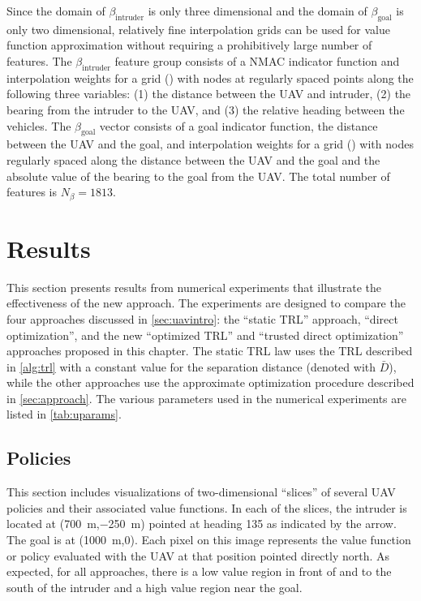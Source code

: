 Since the domain of $\beta_\text{intruder}$ is only three dimensional and the domain of $\beta_\text{goal}$ is only two dimensional, relatively fine interpolation grids can be used for value function approximation without requiring a prohibitively large number of features. The $\beta_\text{intruder}$ feature group consists of a NMAC indicator function and interpolation weights for a grid () with nodes at regularly spaced points along the following three variables: (1) the distance between the UAV and intruder, (2) the bearing from the intruder to the UAV, and (3) the relative heading between the vehicles. The $\beta_\text{goal}$ vector consists of a goal indicator function, the distance between the UAV and the goal, and interpolation weights for a grid () with nodes regularly spaced along the distance between the UAV and the goal and the absolute value of the bearing to the goal from the UAV. The total number of features is $N_\beta = 1813$.


\section{Results} \label{sec:results}

This section presents results from numerical experiments that illustrate the effectiveness of the new approach. The experiments are designed to compare the four approaches discussed in \cref{sec:uavintro}: the ``static TRL'' approach, ``direct optimization'', and the new ``optimized TRL'' and ``trusted direct optimization'' approaches proposed in this chapter. The static TRL law uses the TRL described in \cref{alg:trl} with a constant value for the separation distance (denoted with $\bar{D}$), while the other approaches use the approximate optimization procedure described in \cref{sec:approach}. The various parameters used in the numerical experiments are listed in \cref{tab:uparams}.

\subsection{Policies}

This section includes visualizations of two-dimensional ``slices'' of several UAV policies and their associated value functions. In each of the slices, the intruder is located at (\SI{700}{m},\SI{-250}{m}) pointed at heading 135 as indicated by the arrow. The goal is at (\SI{1000}{m},\num{0}). Each pixel on this image represents the value function or policy evaluated with the UAV at that position pointed directly north. As expected, for all approaches, there is a low value region in front of and to the south of the intruder and a high value region near the goal.

